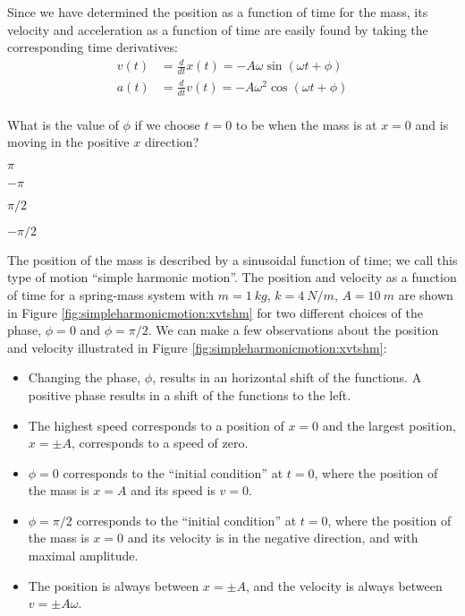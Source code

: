 Since we have determined the position as a function of time for the mass, its velocity and acceleration as a function of time are easily found by taking the corresponding time derivatives:
\begin{align*}
v(t) &= \frac{d}{dt}x(t) = -A\omega\sin(\omega t + \phi)\\
a(t)&= \frac{d}{dt}v(t) = -A\omega^2\cos(\omega t + \phi)\\
\end{align*}

\begin{checkpoint}
\begin{MCquestion}{What is the value of $\phi$ if we choose $t=0$ to be when the mass is at $x=0$ and is moving in the positive $x$ direction?}
\item $\pi$
\item $-\pi$
\item $\pi/2$
\item $-\pi/2$ \correct
\end{MCquestion}
\end{checkpoint}

The position of the mass is described by a sinusoidal function of time; we call this type of motion ``simple harmonic motion''. The position and velocity as a function of time for a spring-mass system with $m=\SI{1}{kg}$, $k=\SI{4}{N/m}$, $A=\SI{10}{m}$ are shown in Figure \ref{fig:simpleharmonicmotion:xvtshm} for two different choices of the phase, $\phi=0$ and $\phi=\pi/2$.
We can make a few observations about the position and velocity illustrated in Figure \ref{fig:simpleharmonicmotion:xvtshm}:
\begin{itemize}
\item Changing the phase, $\phi$, results in an horizontal shift of the functions. A positive phase results in a shift of the functions to the left.
\item The highest speed corresponds to a position of $x=0$ and the largest position, $x=\pm A$, corresponds to a speed of zero.
\item $\phi = 0$ corresponds to the ``initial condition'' at $t=0$, where the position of the mass is $x=A$ and its speed is $v=0$.
\item $\phi = \pi/2$ corresponds to the ``initial condition'' at $t=0$,  where the position of the mass is $x=0$ and its velocity is in the negative direction, and with maximal amplitude.
\item The position is always between $x=\pm A$, and the velocity is always between $v=\pm A\omega$.
\end{itemize}

